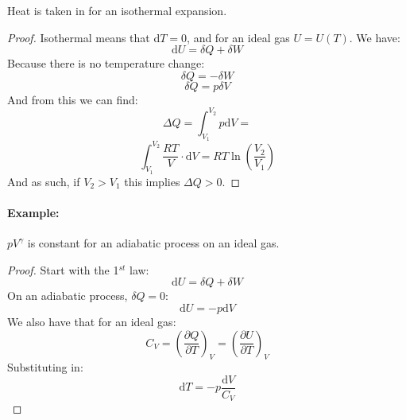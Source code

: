 Heat is taken in for an isothermal expansion.
\begin{proof}
Isothermal means that d$T=0$, and for an ideal gas $U = U(T)$. We have:
$$
	\mathrm{d}U = \delta Q + \delta W
$$
Because there is no temperature change:
$$
	\delta Q = - \delta W
$$
$$
	\delta Q = p \delta V
$$
And from this we can find:
$$
	\Delta Q = \int_{V_1}^{V_2} p \mathrm{d}V = 
$$
$$
	\int_{V_1}^{V_2} \frac{RT}{V}\cdot\mathrm{d}V = 
	RT\ln\left(\frac{V_2}{V_1}\right)
$$
And as such, if $V_2 > V_1$ this implies $\Delta Q > 0$.
\end{proof}

\paragraph{Example: }$pV^\gamma$ is constant for an adiabatic process on an
ideal gas.
\begin{proof}
Start with the 1$^{st}$ law:
$$
	\mathrm{d}U = \delta Q + \delta W
$$
On an adiabatic process, $\delta Q = 0$:
$$
	\mathrm{d}U = - p \mathrm{d}V
$$
We also have that for an ideal gas:
$$
	C_V = \left(\frac{\partial Q}{\partial T}\right)_V = 
	\left(\frac{\partial U}{\partial T}\right)_V
$$
Substituting in:
$$
	\mathrm{d}T = -p \frac{\mathrm{d}V}{C_V}
$$


\end{proof}
